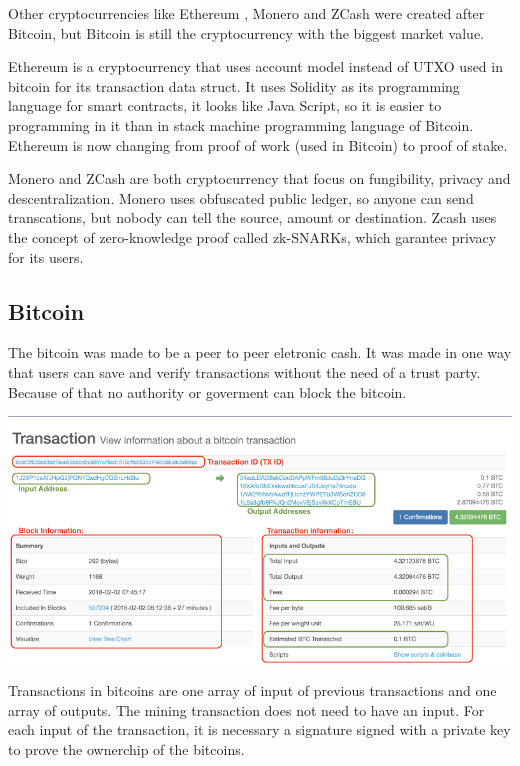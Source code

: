 \documentclass[12pt]{article}
\begin{document}
Other cryptocurrencies like Ethereum \cite{wood2014ethereum}, Monero \cite{noether2015ring} and ZCash \cite{hopwood2016zcash} were created after Bitcoin,
but Bitcoin is still the cryptocurrency with the biggest market value.

Ethereum is a cryptocurrency that uses account model instead of UTXO used in bitcoin for its transaction data struct.
It uses Solidity as its programming language for smart contracts, it looks like Java Script,
so it is easier to programming in it than in stack machine programming language of Bitcoin.
Ethereum is now changing from proof of work (used in Bitcoin) to proof of stake.

Monero and ZCash are both cryptocurrency that focus on fungibility, privacy and descentralization.
Monero uses obfuscated public ledger, so anyone can send transcations, but nobody can tell the source, amount or destination.
Zcash uses the concept of zero-knowledge proof called zk-SNARKs, which garantee privacy for its users.

\subsection{Bitcoin}

The bitcoin was made to be a peer to peer eletronic cash.
It was made in one way that users can save and verify transactions without the need of a trust party.
Because of that no authority or goverment can block the bitcoin.

\includegraphics[width=\columnwidth]{imgs/transactions1.png}

Transactions in bitcoins are one array of input of previous transactions and one array of outputs.
The mining transaction does not need to have an input.
For each input of the transaction, it is necessary a signature signed with a private key to prove the ownerchip of the bitcoins.
\end{document}

